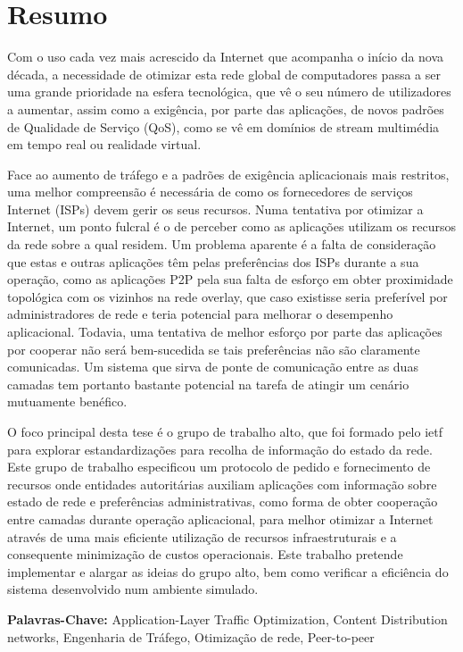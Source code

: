 \chapter{Resumo}

    Com o uso cada vez mais acrescido da Internet que acompanha o início da nova década, a necessidade de otimizar esta rede global de computadores passa a ser uma grande prioridade na esfera tecnológica, que vê o seu número de utilizadores a aumentar, assim como a exigência, por parte das aplicações, de novos padrões de Qualidade de Serviço (QoS), como se vê em domínios de stream multimédia em tempo real ou realidade virtual.

    Face ao aumento de tráfego e a padrões de exigência aplicacionais mais restritos, uma melhor compreensão é necessária de como os fornecedores de serviços Internet (ISPs) devem gerir os seus recursos.
    Numa tentativa por otimizar a Internet, um ponto fulcral é o de perceber como as aplicações utilizam os recursos da rede sobre a qual residem.
    Um problema aparente é a falta de consideração que estas e outras aplicações têm pelas preferências dos ISPs durante a sua operação, como as aplicações P2P pela sua falta de esforço em obter proximidade topológica com os vizinhos na rede overlay, que caso existisse seria preferível por administradores de rede e teria potencial para melhorar o desempenho aplicacional.
    Todavia, uma tentativa de melhor esforço por parte das aplicações por cooperar não será bem-sucedida se tais preferências não são claramente comunicadas.
    Um sistema que sirva de ponte de comunicação entre as duas camadas tem portanto bastante potencial na tarefa de atingir um cenário mutuamente benéfico.

    O foco principal desta tese é o grupo de trabalho \gls{alto}, que foi formado pelo \gls{ietf} para explorar estandardizações para recolha de informação do estado da rede. 
    Este grupo de trabalho especificou um protocolo de pedido e fornecimento de recursos onde entidades autoritárias auxiliam aplicações com informação sobre estado de rede e preferências administrativas, como forma de obter cooperação entre camadas durante operação aplicacional, para melhor otimizar a Internet através de uma mais eficiente utilização de recursos infraestruturais e a consequente minimização de custos operacionais.
    Este trabalho pretende implementar e alargar as ideias do grupo \gls{alto}, bem como verificar a eficiência do sistema desenvolvido num ambiente simulado.

    \bigskip

    \textbf{Palavras-Chave:} Application-Layer Traffic Optimization, Content Distribution networks, Engenharia de Tráfego, Otimização de rede, Peer-to-peer
